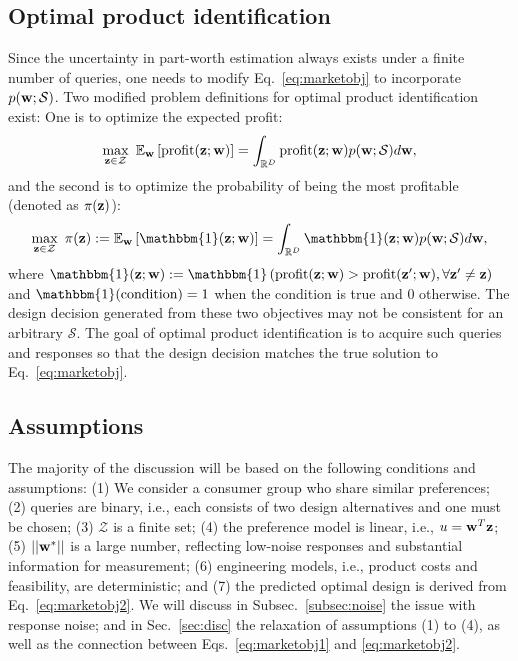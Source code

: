 \documentclass[onecolumn,11pt]{article}
\newcommand{\cutsubsectionup}{\vspace*{-0.09in}}
\newcommand{\cutsubsectionup}{}
\begin{document}
\cutsubsectionup
\subsection{Optimal product identification}
\label{sec:optid}
Since the uncertainty in part-worth estimation always exists under a finite number of queries, one needs to modify Eq.~\eqref{eq:marketobj} to incorporate $p({\bf w};\mathcal{S})$. Two modified problem definitions for optimal product identification exist: One is to optimize the expected profit:
\begin{equation}
    \max_{{\bf z}\in\mathcal{Z}} ~\mathbb{E}_{{\bf w}}\left[\text{profit}({\bf z};{\bf w})\right] = \int_{\mathbb{R}^D} \text{profit}({\bf z};{\bf w})p({\bf w};\mathcal{S})
    d{\bf w},
\label{eq:marketobj1}
\end{equation}
and the second is to optimize the probability of being the most profitable (denoted as $\pi({\bf z})$):
\begin{equation}
\begin{aligned}
\max_{{\bf z}\in\mathcal{Z}} ~\pi({\bf z}) := \mathbb{E}_{{\bf w}}\left[\mathbbm{1}({\bf z};{\bf w})\right]
= \int_{\mathbb{R}^D} \mathbbm{1}({\bf z};{\bf w})p({\bf w};\mathcal{S})
    d{\bf w},
\end{aligned}
\label{eq:marketobj2}
\end{equation}
where $\mathbbm{1}({\bf z};{\bf w}):=\mathbbm{1}\left(\text{profit}({\bf z};{\bf w})>\text{profit}({\bf z}';{\bf w}), \forall {\bf z}'\neq {\bf z} \right)$ and $\mathbbm{1}(\text{condition})=1$ when the condition is true and $0$ otherwise. The design decision generated from these two objectives may not be consistent for an arbitrary $\mathcal{S}$. The goal of optimal product identification is to acquire such queries and responses so that the design decision matches the true solution to Eq.~\eqref{eq:marketobj}.

\cutsubsectionup
\subsection{Assumptions}
\label{sec:assumption}
The majority of the discussion will be based on the following conditions and assumptions: (1) We consider a consumer group who share similar preferences; (2) queries are binary, i.e., each consists of two design alternatives and one must be chosen; (3) $\mathcal{Z}$ is a finite set; (4) the preference model is linear, i.e., $u = {\bf w}^T{\bf z}$; (5) $||{\bf w}^*||$ is a large number, reflecting low-noise responses and substantial information for measurement; (6) engineering models, i.e., product costs and feasibility, are deterministic; and (7) the predicted optimal design is derived from Eq.~\eqref{eq:marketobj2}. We will discuss in Subsec.~\ref{subsec:noise} the issue with response noise; and in Sec.~\ref{sec:disc} the relaxation of assumptions (1) to (4), as well as the connection between Eqs.~\eqref{eq:marketobj1} and \eqref{eq:marketobj2}.
\end{document}
